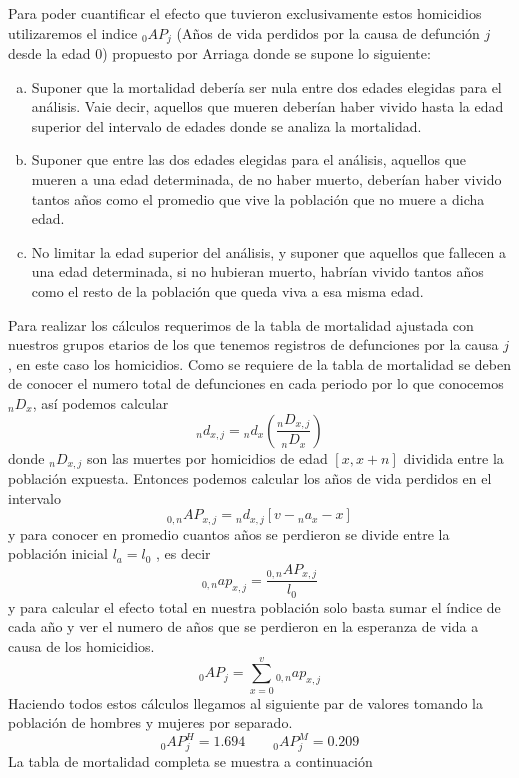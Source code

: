 \documentclass[fontsize=11pt]{article}
\begin{document}
Para poder cuantificar el efecto que tuvieron exclusivamente estos homicidios utilizaremos el indice $_0AP_j$ (Años de vida perdidos por la causa de defunción $j$ desde la edad $0$) propuesto por Arriaga\cite{ARR} donde se supone lo siguiente: 
\begin{enumerate}[a)]
        \item Suponer que la mortalidad debería ser nula entre dos edades
elegidas para el análisis. Vaie decir, aquellos que mueren
deberían haber vivido hasta la edad superior del intervalo de
edades donde se analiza la mortalidad.
        \item Suponer que entre las dos edades elegidas para el análisis,
aquellos que mueren a una edad determinada, de no haber
muerto, deberían haber vivido tantos años como el promedio que
vive la población que no muere a dicha edad.
	\item No limitar la edad superior del análisis, y suponer que aquellos
que fallecen a una edad determinada, si no hubieran muerto,
habrían vivido tantos años como el resto de la población que
queda viva a esa misma edad.
\end{enumerate}
Para realizar los cálculos requerimos de la tabla de mortalidad ajustada con nuestros grupos etarios de los que tenemos registros de defunciones por la causa $j$, en este caso los homicidios. Como se requiere de la tabla de mortalidad se deben de conocer el numero total de defunciones en cada periodo por lo que conocemos $_nD_x$, así podemos calcular $$_n d_{x,j} ={}_nd_x\left( \frac{_n D_{x,j}}{_n D_{x}} \right)$$ donde ${}_nD_{x,j}$ son las muertes por homicidios de edad $[x,x+n]$ dividida entre la población expuesta. Entonces podemos calcular los años de vida perdidos en el intervalo $${}_{0,n}AP_{x,j}= {}_n d_{x,j}[v-{}_n a_x-x]$$ y para conocer en promedio cuantos años se perdieron se divide entre la población inicial $l_a=l_0$ , es decir $${}_{0,n}ap_{x,j}=\frac{{}_{0,n}AP_{x,j}}{l_0}$$ 
y para calcular el efecto total en nuestra población solo basta sumar el índice de cada año y ver el numero de años que se perdieron en la esperanza de vida a causa de los homicidios. $${}_0AP_j=\sum_{x=0}^{v}{}_{0,n}ap_{x,j}$$ Haciendo todos estos cálculos llegamos al siguiente par de valores tomando la población de hombres y mujeres por separado.  $${}_0AP_j^{H} =1.694 \quad \quad {}_0AP_j^{M} = 0.209$$
La tabla de mortalidad completa se muestra a continuación 
\end{document}
